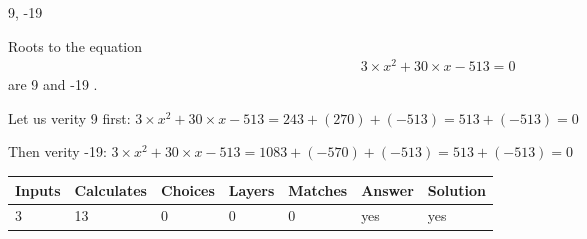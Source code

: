 \documentclass[12pt]{article}
\begin{document}
9,  %
-19
 
 
 
\noindent{}
 
 

 
 
 
\noindent{}
 
 

Roots to the equation
\begin{eqnarray*}
3 \times x^2  %
+  %
30
                 \times x    %
-513 =0
\end{eqnarray*}
are  %
9 and  %
-19 .
 
Let us verity  %
9 first:
$  %
3 \times x^2  %
+  %
30
                 \times x    %
-513
  = %
243+( %
270)+( %
-513)
  = %
513+( %
-513)
  = %
0
$
 
Then verity  %
-19:
$  %
3 \times x^2  %
+  %
30
                 \times x    %
-513
  = %
1083+( %
-570)+( %
-513)
  = %
513+( %
-513)
  = %
0
$
 
 
 
\noindent{}
 
 

 
\vspace{0.3in}
   
   
   
   
\noindent\begin{tabular}{|l|l|l|l|l|l|l|}
 \hline
Inputs & Calculates & Choices & Layers & Matches & Answer & Solution \\ \hline
           3 & 
          13 & 
           0
  & 
           0 & 
           0 & 
  yes & 
  yes 
  \\ \hline
 \end{tabular}
   
   
   
   
\noindent{}
   
   
  
\end{document}
